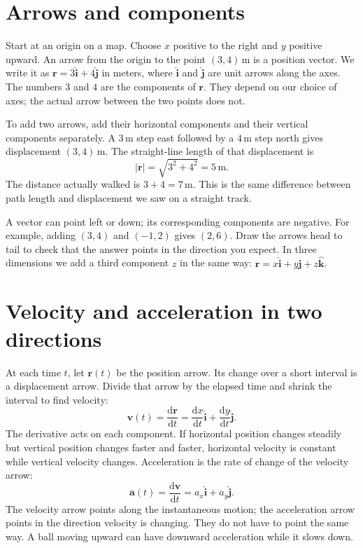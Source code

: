 \documentclass[11pt,oneside]{book}
\newcommand{\dd}{\mathrm{d}}
\newcommand{\vect}[1]{\boldsymbol{#1}}
\newcommand{\od}[2]{\frac{\dd #1}{\dd #2}}
\theoremstyle{reviewstyle}
\begin{document}
\section{Arrows and components}
Start at an origin on a map. Choose $x$ positive to the right and $y$ positive upward. An arrow from the origin to the point $(3,4)\,\mathrm m$ is a position vector. We write it as $\vect r=3\hat{\vect i}+4\hat{\vect j}$ in meters, where $\hat{\vect i}$ and $\hat{\vect j}$ are unit arrows along the axes. The numbers $3$ and $4$ are the components of $\vect r$. They depend on our choice of axes; the actual arrow between the two points does not.

To add two arrows, add their horizontal components and their vertical components separately. A $3\,\mathrm m$ step east followed by a $4\,\mathrm m$ step north gives displacement $(3,4)\,\mathrm m$. The straight-line length of that displacement is
\begin{equation}
|\vect r|=\sqrt{3^2+4^2}=5\,\mathrm m.
\end{equation}
The distance actually walked is $3+4=7\,\mathrm m$. This is the same difference between path length and displacement we saw on a straight track.

A vector can point left or down; its corresponding components are negative. For example, adding $(3,4)$ and $(-1,2)$ gives $(2,6)$. Draw the arrows head to tail to check that the answer points in the direction you expect. In three dimensions we add a third component $z$ in the same way: $\vect r=x\hat{\vect i}+y\hat{\vect j}+z\hat{\vect k}$.

\section{Velocity and acceleration in two directions}
At each time $t$, let $\vect r(t)$ be the position arrow. Its change over a short interval is a displacement arrow. Divide that arrow by the elapsed time and shrink the interval to find velocity:
\begin{equation}
\vect v(t)=\od{\vect r}{t}
=\od{x}{t}\hat{\vect i}+\od{y}{t}\hat{\vect j}.
\end{equation}
The derivative acts on each component. If horizontal position changes steadily but vertical position changes faster and faster, horizontal velocity is constant while vertical velocity changes. Acceleration is the rate of change of the velocity arrow:
\begin{equation}
\vect a(t)=\od{\vect v}{t}
=a_x\hat{\vect i}+a_y\hat{\vect j}.
\end{equation}
The velocity arrow points along the instantaneous motion; the acceleration arrow points in the direction velocity is changing. They do not have to point the same way. A ball moving upward can have downward acceleration while it slows down.
\end{document}
